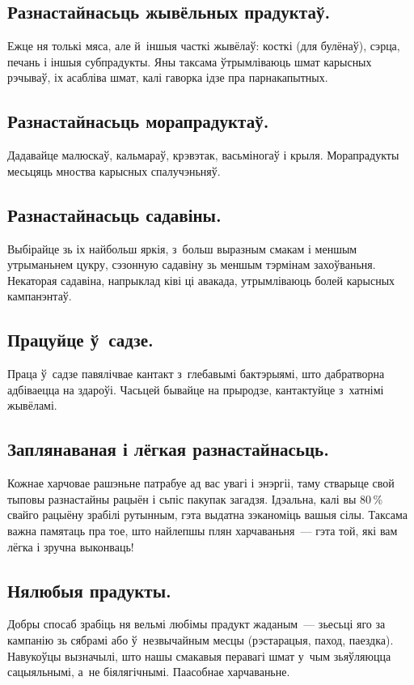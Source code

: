 \subsection{Разнастайнасьць жывёльных прадуктаў.}
Ежце ня толькі мяса, але й~іншыя часткі жывёлаў: косткі (для булёнаў), сэрца, печань і іншыя субпрадукты. Яны таксама ўтрымліваюць шмат карысных рэчываў, іх асабліва шмат, калі гаворка ідзе пра парнакапытных.


\subsection{Разнастайнасьць морапрадуктаў.}
Дадавайце малюскаў, кальмараў, крэвэтак, васьміногаў і крыля. Морапрадукты месьцяць мноства карысных спалучэньняў.

\subsection{Разнастайнасьць садавіны.}
Выбірайце зь іх найбольш яркія, з~больш выразным смакам і меншым утрыманьнем цукру, сэзонную садавіну зь меншым тэрмінам захоўваньня. Некаторая садавіна, напрыклад ківі ці авакада, утрымліваюць болей карысных кампанэнтаў.

\subsection{Працуйце ў~садзе.}
Праца ў~садзе павялічвае кантакт з~глебавымі бактэрыямі, што дабратворна адбіваецца на здароўі. Часьцей бывайце на прыродзе, кантактуйце з~хатнімі жывёламі.

\subsection{Заплянаваная і лёгкая разнастайнасьць.}
Кожнае харчовае рашэньне патрабуе ад вас увагі і энэргіі, таму стварыце свой тыповы разнастайны рацыён і сьпіс пакупак загадзя. Ідэальна, калі вы 80\,\% свайго рацыёну зрабілі рутынным, гэта выдатна зэканоміць вашыя сілы. Таксама важна памятаць пра тое, што найлепшы плян харчаваньня~--- гэта той, які вам лёгка і зручна выконваць!

\subsection{Нялюбыя прадукты.}
Добры спосаб зрабіць ня вельмі любімы прадукт жаданым~--- зьесьці яго за кампанію зь сябрамі або ў~незвычайным месцы (рэстарацыя, паход, паездка). Навукоўцы вызначылі, што нашы смакавыя перавагі шмат у~чым зьяўляюцца сацыяльнымі, а~не біялягічнымі.
Паасобнае харчаваньне.

